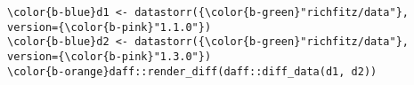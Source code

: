 \documentclass[class=minimal,border=0]{standalone}
\begin{document}
%
\begin{BVerbatim}[bgcolor=b-darkgrey]
\color{b-blue}d1 <- datastorr({\color{b-green}"richfitz/data"}, version={\color{b-pink}"1.1.0"})
\color{b-blue}d2 <- datastorr({\color{b-green}"richfitz/data"}, version={\color{b-pink}"1.3.0"})
\color{b-orange}daff::render_diff(daff::diff_data(d1, d2))
\end{BVerbatim}
\end{document}

